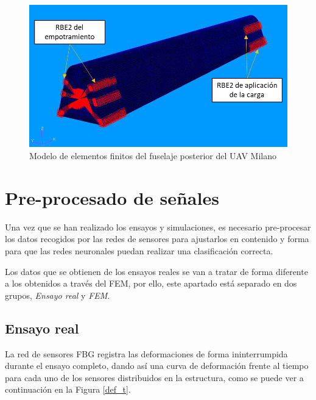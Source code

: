 \begin{figure}[h!]
    \centering
    \includegraphics[width=120mm]{3/Fotos/femest.png}
    \captionsetup{justification=centering,margin=1.25cm}
    \caption{Modelo de elementos finitos del fuselaje posterior del UAV Milano}
    \label{femest}
\end{figure}



\clearpage

\section{Pre-procesado de señales}

Una vez que se han realizado los ensayos y simulaciones, es necesario pre-procesar los datos recogidos por las redes de sensores para ajustarlos en contenido y forma para que las redes neuronales puedan realizar una clasificación correcta.

Los datos que se obtienen de los ensayos reales se van a tratar de forma diferente a los obtenidos a través del FEM, por ello, este apartado está separado en dos grupos, \textit{Ensayo real} y \textit{FEM}.

\subsection{Ensayo real}
    
La red de sensores FBG registra las deformaciones de forma ininterrumpida durante el ensayo completo, dando así una curva de deformación frente al tiempo para cada uno de los sensores distribuidos en la estructura, como se puede ver a continuación en la Figura \ref{def_t}.\\
    
